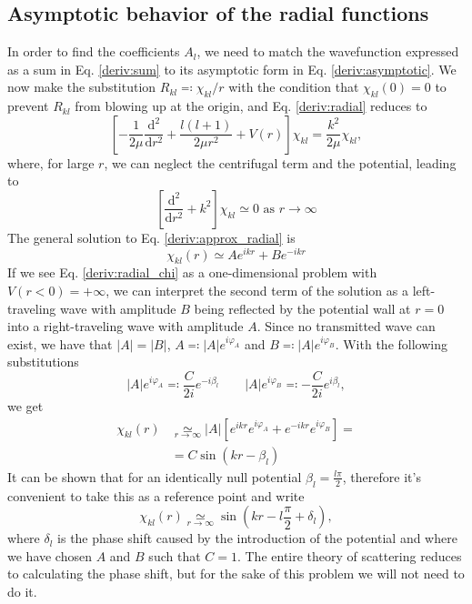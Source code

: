 \subsection{Asymptotic behavior of the radial functions}
In order to find the coefficients \(A_l\), we need to match the wavefunction expressed as a sum in Eq. \eqref{deriv:sum} to its asymptotic form in Eq. \eqref{deriv:asymptotic}. We now make the substitution \(R_{kl} \eqqcolon \chi_{kl} / r\) with the condition that \(\chi_{kl} (0)=0\) to prevent \(R_{kl} \) from blowing up at the origin, and Eq. \eqref{deriv:radial} reduces to
\begin{equation}\label{deriv:radial_chi}
	\left[- \frac{1}{2\mu }\frac{\mathrm{d}^2}{\mathrm{d}r^2} + \frac{l(l+1)}{2\mu r^2}+ V(r)\right]\chi_{kl} = \frac{k^2}{2\mu }\chi_{kl},
\end{equation}
where, for large \(r\), we can neglect the centrifugal term and the potential, leading to
\begin{equation}\label{deriv:approx_radial}
	\left[ \frac{\mathrm{d}^2}{\mathrm{d}r^2} + k^2  \right] \chi_{kl}  \simeq 0 \text{ as } r \to \infty 
\end{equation}
The general solution to Eq. \eqref{deriv:approx_radial} is
\begin{equation}
	\chi_{kl} (r) \simeq A e^{ikr} + B e^{-ikr}
\end{equation}
If we see Eq. \eqref{deriv:radial_chi} as a one-dimensional problem with \(V(r < 0) = +\infty \), we can interpret the second term of the solution as a left-traveling wave with amplitude \(B\) being reflected by the potential wall at \(r=0\) into a right-traveling wave with amplitude \(A\). Since no transmitted wave can exist, we have that \(\vert A \vert = \vert B \vert \), \(A\eqqcolon \vert A \vert e^{i\varphi_A} \) and \(B \eqqcolon  \vert A \vert e^{i\varphi_B}\). With the following substitutions
\begin{equation}
	\vert A \vert e^{i \varphi_A} \eqqcolon \frac{C}{2i} e^{-i \beta_l}
	\qquad
	\vert A \vert e^{i \varphi _B} \eqqcolon - \frac{C}{2i} e^{i \beta _l},
\end{equation}
we get
\begin{align}
	\chi_{kl}(r) &\underset{r \to \infty }{\simeq} \vert A \vert \left[ e^{ikr} e^{i \varphi_A}+ e^{-ikr} e^{i \varphi_B} \right] =\\
	&= C \sin (kr - \beta _l)
\end{align}
It can be shown \cite{Cohen-Tannoudji} that for an identically null potential \(\beta _l = \frac{l \pi }{2}\), therefore it's convenient to take this as a reference point and write
\begin{equation}\label{deriv:chi_asymptotic}
	\chi_{kl} (r) \underset{r \to \infty }{\simeq} \sin\left(kr- l \frac{\pi}{2} + \delta _l\right),
\end{equation}
where \(\delta _l\) is the phase shift caused by the introduction of the potential and where we have chosen \(A\) and \(B\) such that \(C=1\). The entire theory of scattering reduces to calculating the phase shift, but for the sake of this problem we will not need to do it.


